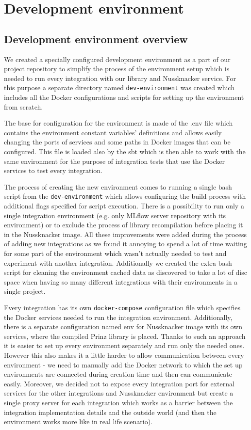 \chapter{Development environment}
\label{chap:devenv}

\section{Development environment overview}

We created a specially configured development environment as a part of our project repository to
simplify the process of the environment setup which is needed to run every integration with our
library and Nussknacker service. For this purpose a separate directory named \texttt{dev-environment} was
created which includes all the Docker configurations and scripts for setting up the environment
from scratch.

The base for configuration for the environment is made of the .env file which contains the environment
constant variables’ definitions and allows easily changing the ports of services and some paths in
Docker images that can be configured. This file is loaded also by the sbt which is then able to work
with the same environment for the purpose of integration tests that use the Docker services to test
every integration.

The process of creating the new environment comes to running a single bash script from the \texttt{dev-environment}
which allows configuring the build process with additional flags specified for script execution. There is
a possibility to run only a single integration environment (e.g. only MLflow server repository with its
environment) or to exclude the process of library recompilation before placing it in the Nussknacker image.
All these improvements were added during the process of adding new integrations as we found it annoying
to spend a lot of time waiting for some part of the environment which wasn’t actually needed to test
and experiment with another integration. Additionally we created the extra bash script for cleaning
the environment cached data as discovered to take a lot of disc space when having so many different
integrations with their environments in a single project.

Every integration has its own \texttt{docker-compose} configuration file which specifies the Docker services
needed to run the integration environment. Additionally, there is a separate configuration named env
for Nussknacker image with its own services, where the compiled Prinz library is placed. Thanks to
such an approach it is easier to set up every environment separately and run only the needed ones.
However this also makes it a little harder to allow communication between every environment - we need
to manually add the Docker network to which the set up environments are connected during creation
time and then can communicate easily. Moreover, we decided not to expose every integration port for
external services for the other integrations and Nussknacker environment but create a single proxy
server for each integration which works as a barrier between the integration implementation details
and the outside world (and then the environment works more like in real life scenario).

